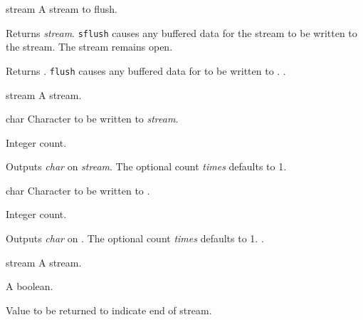 \begin{optDefinition}
\begin{arguments}
    \item[stream] A stream to flush.
\end{arguments}
%
\result%
Returns {\em stream}.
%
\remarks%
{\tt sflush} causes any buffered data for the stream to be written to
the stream. The stream remains open.

%
\result%
Returns .
%
\remarks%
{\tt flush} causes any buffered data for  to be written to
.
%
\seealso%
.

\begin{arguments}
    \item[stream] A stream.
    \item[char] Character to be written to {\em stream}.
    \item[\optional{times}] Integer count.
\end{arguments}
%
\result%
Outputs {\em char} on {\em stream}.  The optional count {\em times\/} defaults
to 1.

\begin{arguments}
    \item[char] Character to be written to .
    \item[\optional{times}] Integer count.
\end{arguments}
%
\result%
Outputs {\em char} on . The optional count {\em times\/}
defaults to 1.
%
\seealso%
.

\begin{arguments}
    \item[stream] A stream.
    \item[\optional{eos-error?}] A boolean.
    \item[\optional{eos-value}] Value to be returned to indicate end of stream.
\end{arguments}


\end{optDefinition}
